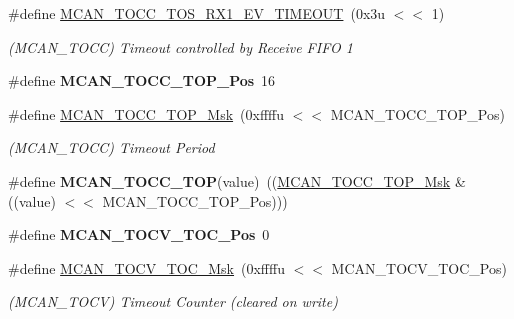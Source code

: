 \begin{DoxyCompactItemize}
\mbox{\label{group__SAMV71__MCAN_ga9c6c59f2ca37f1b880feb3628b656895}} 
\#define \mbox{\hyperlink{group__SAMV71__MCAN_ga9c6c59f2ca37f1b880feb3628b656895}{M\+C\+A\+N\+\_\+\+T\+O\+C\+C\+\_\+\+T\+O\+S\+\_\+\+R\+X1\+\_\+\+E\+V\+\_\+\+T\+I\+M\+E\+O\+UT}}~(0x3u $<$$<$ 1)
\begin{DoxyCompactList}\small\item\em (M\+C\+A\+N\+\_\+\+T\+O\+CC) Timeout controlled by Receive F\+I\+FO 1 \end{DoxyCompactList}\item 
\mbox{\label{group__SAMV71__MCAN_ga5159987645c490d9c0c27b5d9c374571}} 
\#define {\bfseries M\+C\+A\+N\+\_\+\+T\+O\+C\+C\+\_\+\+T\+O\+P\+\_\+\+Pos}~16
\item 
\mbox{\label{group__SAMV71__MCAN_gae5b467deea06161dad9c03db7838b3bb}} 
\#define \mbox{\hyperlink{group__SAMV71__MCAN_gae5b467deea06161dad9c03db7838b3bb}{M\+C\+A\+N\+\_\+\+T\+O\+C\+C\+\_\+\+T\+O\+P\+\_\+\+Msk}}~(0xffffu $<$$<$ M\+C\+A\+N\+\_\+\+T\+O\+C\+C\+\_\+\+T\+O\+P\+\_\+\+Pos)
\begin{DoxyCompactList}\small\item\em (M\+C\+A\+N\+\_\+\+T\+O\+CC) Timeout Period \end{DoxyCompactList}\item 
\mbox{\label{group__SAMV71__MCAN_gae192b8b0e7ccc8e903c27fb6302af1c0}} 
\#define {\bfseries M\+C\+A\+N\+\_\+\+T\+O\+C\+C\+\_\+\+T\+OP}(value)~((\mbox{\hyperlink{group__SAMV71__MCAN_gae5b467deea06161dad9c03db7838b3bb}{M\+C\+A\+N\+\_\+\+T\+O\+C\+C\+\_\+\+T\+O\+P\+\_\+\+Msk}} \& ((value) $<$$<$ M\+C\+A\+N\+\_\+\+T\+O\+C\+C\+\_\+\+T\+O\+P\+\_\+\+Pos)))
\item 
\mbox{\label{group__SAMV71__MCAN_ga9b55684ffe1764ea1a51bbcc5590790c}} 
\#define {\bfseries M\+C\+A\+N\+\_\+\+T\+O\+C\+V\+\_\+\+T\+O\+C\+\_\+\+Pos}~0
\item 
\mbox{\label{group__SAMV71__MCAN_gad85d6aea1ff1f7f67073ce2494e37452}} 
\#define \mbox{\hyperlink{group__SAMV71__MCAN_gad85d6aea1ff1f7f67073ce2494e37452}{M\+C\+A\+N\+\_\+\+T\+O\+C\+V\+\_\+\+T\+O\+C\+\_\+\+Msk}}~(0xffffu $<$$<$ M\+C\+A\+N\+\_\+\+T\+O\+C\+V\+\_\+\+T\+O\+C\+\_\+\+Pos)
\begin{DoxyCompactList}\small\item\em (M\+C\+A\+N\+\_\+\+T\+O\+CV) Timeout Counter (cleared on write) \end{DoxyCompactList}\item 

\end{DoxyCompactItemize}
